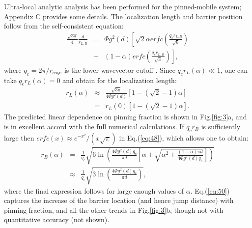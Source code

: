 \documentclass[twocolumn,showpacs,preprintnumbers,amsmath,amssymb,unsortedaddress,
]{revtex4-1}
\begin{document}
Ultra-local analytic analysis has been performed for the pinned-mobile system; Appendix C provides some details. The localization length and barrier position follow from the self-consistent equation:
\begin{eqnarray}
\frac{\sqrt{3\pi}}{4}\frac{d}{r_{L,B}} &=& \Phi g^2(d)\left[\sqrt{2}\alpha erfc\left(\frac{q_cr_{L,B}}{\sqrt{6}}\right)\right.\nonumber\\
&+& \left. (1-\alpha)erfc\left(\frac{q_cr_{L,B}}{\sqrt{3}}\right) \right], 
\label{eq:48}
\end{eqnarray}
where $q_c = 2\pi/r_{cage}$ is the lower wavevector cutoff \cite{45}. Since $q_cr_L(\alpha) \ll 1$, one can take $q_cr_L(\alpha) =0$ and obtain for the localization length:
\begin{eqnarray}
r_L(\alpha) &\approx& \frac{\sqrt{3\pi}}{4\Phi g^2(d)}\left[1- (\sqrt{2}-1)\alpha \right] \nonumber\\
&=& r_L(0)\left[1- (\sqrt{2}-1)\alpha \right].
\label{eq:49}
\end{eqnarray}
The predicted linear dependence on pinning fraction is shown in Fig.\ref{fig:3}a, and is in excellent accord with the full numerical calculations. If $q_cr_B$ is sufficiently large then $erfc(x)\approx e^{-x^2}/(x\sqrt{\pi})$ in Eq.(\ref{eq:48}), which allows one to obtain:
\begin{eqnarray}
r_B(\alpha) &=& \frac{1}{q_c}\sqrt{6\ln\left( \frac{4\Phi g^2(d)q_c}{\pi d} \left[\alpha + \sqrt{\alpha^2+\frac{(1-\alpha)\pi d}{4\Phi g^2(d)q_c}} \right]\right)}\nonumber\\
&\approx& \frac{1}{q_c}\sqrt{3\ln\left( \frac{4\Phi g^2(d)q_c}{\pi d}\right)},
\label{eq:50}
\end{eqnarray}
where the final expression follows for large enough values of $\alpha$. Eq.(\ref{eq:50}) captures the increase of the barrier location (and hence jump distance) with pinning fraction, and all the other trends in Fig.\ref{fig:3}b, though not with quantitative accuracy (not shown).
\end{document}
